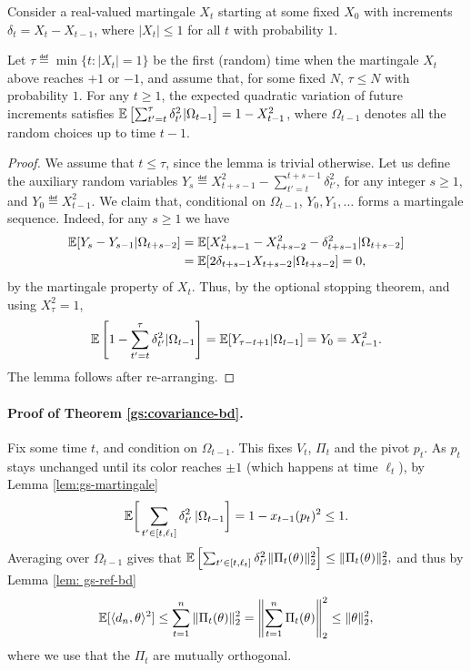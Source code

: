 Consider a real-valued martingale  $X_t$ starting at some fixed $X_0$
with increments $\delta_t = X_t - X_{t-1}$, where  $|X_t |\leq 1$ for
all $t$ with probability $1$.
\begin{lemma} \label{lem:gs-martingale} Let
  $\tau \eqdef \min\{t: |X_t| = 1\}$ be the first (random) time when
  the martingale $X_t$ above reaches $+1$ or $-1$, and assume that,
  for some fixed $N$, $\tau \le N$ with probability $1$. For any
  $t\geq 1$, the expected quadratic variation of future increments
  satisfies
  $\mathbb{E}\left[ \sum_{t'= t}^\tau \delta_{t'}^2 | \Omega_{t-1}\right] =
  1-X_{t-1}^2$, where $\Omega_{t-1}$ denotes all the random choices up
  to time $t-1$.
\end{lemma}
\begin{proof}
  We assume that $t \le \tau$, since the lemma is trivial otherwise.
  Let us define the auxiliary random variables $Y_s \eqdef X_{t+s-1}^2 - \sum_{t' =
    t}^{t+s-1} \delta_{t'}^2$, for any integer $s \ge 1$, and $Y_{0}
  \eqdef X_{t-1}^2$. We claim that, conditional on $\Omega_{t-1}$,
  $Y_0, Y_1, \ldots$ forms a
  martingale sequence. Indeed, for any $s \ge 1$ we have
  \begin{align*}
    \mathbb{E}[Y_s - Y_{s-1}|\Omega_{t+s-2}]
    &= \mathbb{E}[X_{t+s-1}^2  - X_{t+s-2}^2 - \delta_{t+s-1}^2|\Omega_{t+s-2}]\\
    &= \mathbb{E}[2\delta_{t+s-1}X_{t+s-2} | \Omega_{t+s-2}]  = 0,
  \end{align*}
  by the martingale property of $X_t$. Thus, by the optional stopping
  theorem, and using $X_{\tau}^2 = 1$,
  \[
    \mathbb{E}\left[1 - \sum_{t'=t}^\tau \delta_{t'}^2|\Omega_{t-1}\right]
    =\mathbb{E}[Y_{\tau - t+1}|\Omega_{t-1}]
    = Y_0 = X_{t-1}^2.
  \]
  The lemma follows after re-arranging.
\end{proof}

\paragraph{Proof of Theorem \ref{gs:covariance-bd}.}
Fix some time $t$, and condition on $\Omega_{t-1}$. This fixes $V_t$, $\Pi_t$ and the pivot $p_t$. As $p_t$ stays unchanged until its color reaches $\pm 1$ (which happens at time $\ell_t$), by Lemma \ref{lem:gs-martingale} 
\[ \mathbb{E} \bigg[ \sum_{t'\in [t,\ell_t]} \delta_{t'}^2\, |\Omega_{t-1} \bigg] = 1- x_{t-1}(p_t)^2 \leq 1.\]
Averaging over $\Omega_{t-1}$ gives that  $\mathbb{E} \left[ \sum_{t' \in [t, \ell_t]} \delta_{t'}^2 \|\Pi_t (\theta)\|_2^2\right] \leq \|\Pi_t (\theta)\|_2^2,$  and thus by Lemma \ref{lem: gs-ref-bd} 
\[ \mathbb{E}[\langle d_n,\theta\rangle^2] \leq \sum_{t=1}^n \|\Pi_{t} (\theta) \|_2^2
  = \left\|\sum_{t=1}^n\Pi_t(\theta)\right\|_2^2
 \leq \|\theta\|_2^2, \] 
where we use that the  $\Pi_t$ are mutually orthogonal. 

